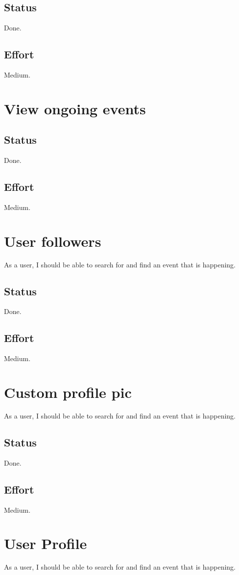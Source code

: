 \documentclass[10pt,a4paper]{article}
\begin{document}
\subsection{Status}
Done.

\subsection{Effort}
Medium.

\section{View ongoing events}
\subsection{Status}
Done.

\subsection{Effort}
Medium.

\section{User followers}
As a user, I should be able to search for and find an event that is happening.
\subsection{Status}
Done.

\subsection{Effort}
Medium.

\section{Custom profile pic}
As a user, I should be able to search for and find an event that is happening.
\subsection{Status}
Done.

\subsection{Effort}
Medium.

\section{User Profile}
As a user, I should be able to search for and find an event that is happening.
\end{document}

